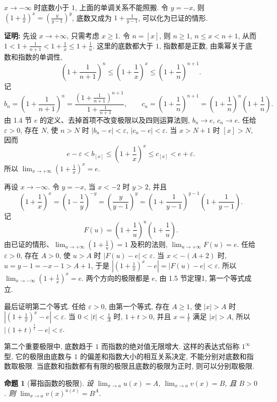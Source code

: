 \documentclass[UTF8,openany]{ctexbook}
\theoremstyle{chinesetextbook}
\newenvironment{cnproof}{\par\indent\textbf{证明:} \ignorespaces}{\par}
\newtheorem*{propositionsingle}{命题}
\begin{document}
$x\to-\infty$ 时底数小于 $1$, 上面的单调关系不能照搬. 令 $y=-x$, 则 $\displaystyle\left(1+\frac1x\right)^x=\left(\frac y{y-1}\right)^y$, 底数又成为 $\displaystyle1+\frac1{y-1}$, 可以化为已证的情形.
\begin{cnproof}
先设 $x\to+\infty$, 只需考虑 $x\ge1$. 令 $n=[x]$, 则 $n\ge1$, $n\le x<n+1$, 从而 $\displaystyle1<1+\frac1{n+1}<1+\frac1x\le1+\frac1n$. 这里的底数都大于 $1$, 指数都是正数, 由乘幂关于底数和指数的单调性,
\[
\left(1+\frac1{n+1}\right)^n\le\left(1+\frac1x\right)^x\le\left(1+\frac1n\right)^{n+1}.
\]
记
\[
b_n=\left(1+\frac1{n+1}\right)^n=\frac{\left(1+\frac1{n+1}\right)^{n+1}}{1+\frac1{n+1}},\qquad c_n=\left(1+\frac1n\right)^{n+1}=\left(1+\frac1n\right)^n\left(1+\frac1n\right).
\]
由 1.4 节 $e$ 的定义、去掉首项不改变极限以及四则运算法则, $b_n\to e$, $c_n\to e$. 任给 $\varepsilon>0$, 存在 $N$, 使 $n>N$ 时 $|b_n-e|<\varepsilon$, $|c_n-e|<\varepsilon$. 当 $x>N+1$ 时 $[x]>N$, 因而
\[
e-\varepsilon<b_{[x]}\le\left(1+\frac1x\right)^x\le c_{[x]}<e+\varepsilon.
\]
所以 $\displaystyle\lim_{x\to+\infty}\left(1+\frac1x\right)^x=e$.

再设 $x\to-\infty$. 令 $y=-x$, 当 $x<-2$ 时 $y>2$, 并且
\[
\left(1+\frac1x\right)^x=\left(1-\frac1y\right)^{-y}=\left(\frac y{y-1}\right)^y=\left(1+\frac1{y-1}\right)^{y-1}\left(1+\frac1{y-1}\right).
\]
记
\[
F(u)=\left(1+\frac1u\right)^u\left(1+\frac1u\right).
\]
由已证的情形、$\displaystyle\lim_{u\to+\infty}\left(1+\frac1u\right)=1$ 及积的法则, $\displaystyle\lim_{u\to+\infty}F(u)=e$. 任给 $\varepsilon>0$, 存在 $A>0$, 使 $u>A$ 时 $|F(u)-e|<\varepsilon$. 当 $x<-(A+2)$ 时, $u=y-1=-x-1>A+1$, 于是 $\displaystyle\left|\left(1+\frac1x\right)^x-e\right|=|F(u)-e|<\varepsilon$. 所以 $\displaystyle\lim_{x\to-\infty}\left(1+\frac1x\right)^x=e$. 两个方向的极限都是 $e$, 由 1.5 节定理1, 第一个等式成立.

最后证明第二个等式. 任给 $\varepsilon>0$, 由第一个等式, 存在 $A\ge1$, 使 $|x|>A$ 时 $\displaystyle\left|\left(1+\frac1x\right)^x-e\right|<\varepsilon$. 当 $\displaystyle0<|t|<\frac1A$ 时, $1+t>0$, 并且 $\displaystyle x=\frac1t$ 满足 $|x|>A$, 所以 $\bigl|(1+t)^{\frac1t}-e\bigr|<\varepsilon$.
\end{cnproof}
第二个重要极限中, 底数趋于 $1$ 而指数的绝对值无限增大. 这样的表达式俗称 $1^\infty$ 型, 它的极限由底数与 $1$ 的偏差和指数大小的相互关系决定, 不能分别对底数和指数取极限. 当底数和指数都有有限的极限且底数的极限为正时, 则可以分别取极限.
\begin{propositionsingle}[幂指函数的极限]
设 $\displaystyle\lim_{x\to a}u(x)=A$, $\displaystyle\lim_{x\to a}v(x)=B$, 且 $B>0$. 则 $\displaystyle\lim_{x\to a}v(x)^{u(x)}=B^A$.
\end{propositionsingle}
\end{document}
